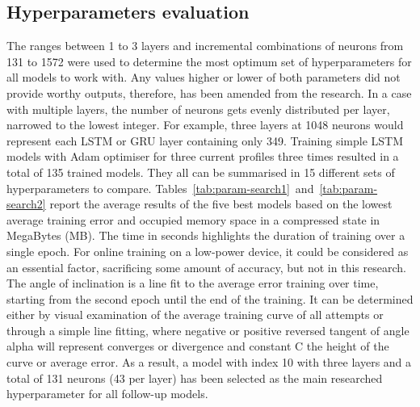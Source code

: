 %
%
\subsection{Hyperparameters evaluation}
The ranges between 1 to 3 layers and incremental combinations of neurons from 131 to 1572 were used to determine the most optimum set of hyperparameters for all models to work with.
Any values higher or lower of both parameters did not provide worthy outputs, therefore, has been amended from the research.
In a case with multiple layers, the number of neurons gets evenly distributed per layer, narrowed to the lowest integer.
For example, three layers at 1048 neurons would represent each LSTM or GRU layer containing only 349.
Training simple LSTM models with Adam optimiser for three current profiles three times resulted in a total of 135 trained models.
They all can be summarised in 15 different sets of hyperparameters to compare.
\mbox{Tables~\ref{tab:param-search1} and~\ref{tab:param-search2}} report the average results of the five best models based on the lowest average training error and occupied memory space in a compressed state in MegaBytes (MB).
The time in seconds highlights the duration of training over a single epoch.
For online training on a low-power device, it could be considered as an essential factor, sacrificing some amount of accuracy, but not in this research.
The angle of inclination is a line fit to the average error training over time, starting from the second epoch until the end of the training.
It can be determined either by visual examination of the average training curve of all attempts or through a simple line fitting, where negative or positive reversed tangent of angle alpha will represent converges or divergence and constant C the height of the curve or average error.
%
As a result, a model with index 10 with three layers and a total of 131 neurons (43 per layer) has been selected as the main researched hyperparameter for all follow-up models.
